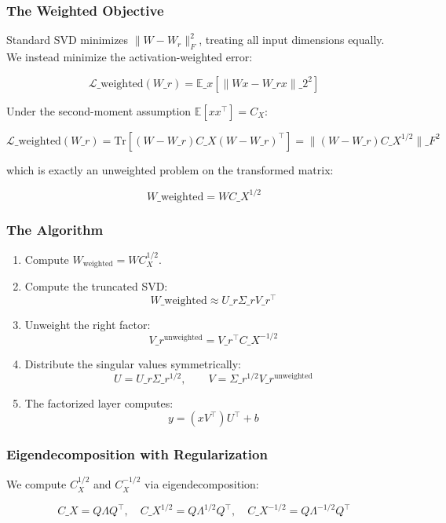 \subsubsection{The Weighted Objective}

Standard SVD minimizes $\|W - W_r\|_F^2$, treating all input dimensions 
equally. We instead minimize the activation-weighted error:

\[
\mathcal{L}\_\text{weighted}(W\_r) = \mathbb{E}\_{x}\!\left[\|W x - W\_r x\|\_2^2\right]
\tag{4.5}
\]

Under the second-moment assumption $\mathbb{E}[x x^\top] = C_X$:

\[
\mathcal{L}\_\text{weighted}(W\_r) = \mathrm{Tr}\!\left[(W - W\_r) C\_X (W - W\_r)^\top\right] = \|(W - W\_r) C\_X^{1/2}\|\_F^2
\tag{4.6}
\]

which is exactly an unweighted problem on the transformed matrix:

\[
W\_\text{weighted} = W C\_X^{1/2}
\tag{4.7}
\]

\subsubsection{The Algorithm}

\begin{enumerate}
\item Compute $W_\text{weighted} = W C_X^{1/2}$.
\item Compute the truncated SVD:
  $$
  W\_\text{weighted} \approx U\_r \Sigma\_r V\_r^\top
  \tag{4.8}
  $$
\item Unweight the right factor:
  $$
  V\_r^\text{unweighted} = V\_r^\top C\_X^{-1/2}
  \tag{4.9}
  $$
\item Distribute the singular values symmetrically:
  $$
  U = U\_r \Sigma\_r^{1/2}, \qquad
  V = \Sigma\_r^{1/2} V\_r^\text{unweighted}
  \tag{4.10}
  $$
\item The factorized layer computes:
  $$
  y = (x V^\top) U^\top + b
  \tag{4.11}
  $$

\end{enumerate}
\subsubsection{Eigendecomposition with Regularization}

We compute $C_X^{1/2}$ and $C_X^{-1/2}$ via eigendecomposition:

\[
C\_X = Q \Lambda Q^\top, \quad
C\_X^{1/2} = Q \Lambda^{1/2} Q^\top, \quad
C\_X^{-1/2} = Q \Lambda^{-1/2} Q^\top
\tag{4.12}
\]

